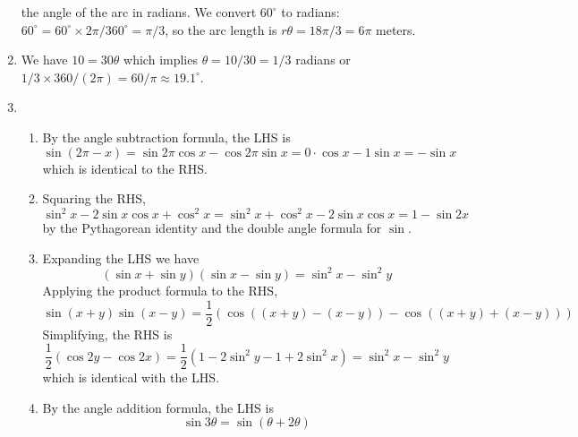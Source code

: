 \documentclass{article}
\newcommand{\ds}{\displaystyle}
\begin{document}
\begin{enumerate}
  the angle of the arc in radians.  We convert $60^{\circ}$ to
  radians: $60^{\circ} = 60^{\circ}\times 2\pi/360^{\circ} = \pi/3$,
  so the arc length is $r\theta = 18\pi/3 = 6\pi$ meters.
\item %
  We have $10 = 30 \theta$ which implies $\theta=10/30 = 1/3$ radians
  or $1/3 \times 360/(2\pi) = 60/\pi \approx 19.1^{\circ}$.  
\item %
  \begin{enumerate}
  \item %
    By the angle subtraction formula, the LHS is
    \begin{equation*}
      \sin(2\pi - x) = \sin 2\pi \cos x - \cos 2\pi \sin x
      = 0 \cdot \cos x - 1 \sin x 
      = -\sin x
    \end{equation*}
    which is identical to the RHS.
  \item %
    Squaring the RHS,
    \begin{equation*}
      \sin^2 x -2 \sin x \cos x + \cos^2 x 
      = \sin^2 x + \cos^2 x - 2\sin x \cos x
      = 1 - \sin 2x
    \end{equation*}
    by the Pythagorean identity and the double angle formula for $\sin$.
  \item %
    Expanding the LHS we have
    \begin{equation*}
      (\sin x +\sin y)(\sin x-\sin y) = \sin^2 x - \sin^2 y
    \end{equation*}
    Applying the product formula to the RHS,
    \begin{equation*}
      \sin(x+y)\sin(x-y) = \frac{1}{2}\left(
      \cos((x+y)-(x-y))-\cos((x+y)+(x-y))\right)
    \end{equation*}
    Simplifying, the RHS is
    \begin{equation*}
      \frac{1}{2}\left( \cos 2y - \cos 2x \right)
      = \frac{1}{2} \left( 1-2\sin^2 y - 1 + 2\sin^2 x \right)
      = \sin^2 x - \sin^2 y
    \end{equation*}
    which is identical with the LHS.
  \item %
    By the angle addition formula, the LHS is
    \begin{equation*}
      \sin 3\theta = \sin (\theta + 2\theta)

\end{equation*}
\end{enumerate}
\end{enumerate}
\end{document}
